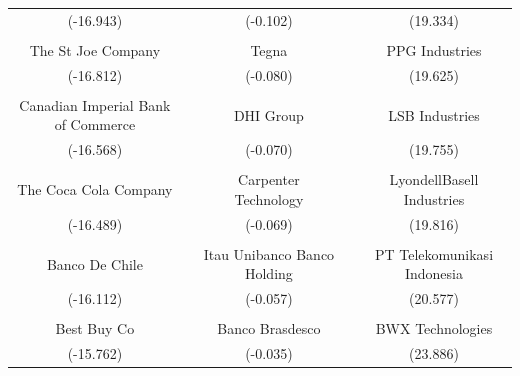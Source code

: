 \documentclass[11pt]{article}
\begin{document}
\begin{center}
\begin{table}[h]
{\begin{tabular}{clccc}
(-16.943)                          &  & (-0.102)                    &                      & (19.334)                       \\
\multicolumn{1}{l}{}               &  &                             &                      &                                \\
The St Joe Company                 &  & Tegna                       &                      & PPG Industries                 \\
(-16.812)                          &  & (-0.080)                    &                      & (19.625)                       \\
\multicolumn{1}{l}{}               &  &                             &                      &                                \\
Canadian Imperial Bank of Commerce &  & DHI Group                   &                      & LSB Industries                 \\
(-16.568)                          &  & (-0.070)                    &                      & (19.755)                       \\
\multicolumn{1}{l}{}               &  &                             &                      &                                \\
The Coca Cola Company              &  & Carpenter Technology        &                      & LyondellBasell Industries       \\
(-16.489)                          &  & (-0.069)                    &                      & (19.816)                       \\
\multicolumn{1}{l}{}               &  & \multicolumn{1}{l}{}        & \multicolumn{1}{l}{} & \multicolumn{1}{l}{}           \\
Banco De Chile                     &  & Itau Unibanco Banco Holding &                      & PT Telekomunikasi Indonesia    \\
(-16.112)                          &  & (-0.057)                    &                      & (20.577)                       \\
\multicolumn{1}{l}{}               &  &                             &                      &                                \\
Best Buy Co                        &  & Banco Brasdesco             &                      & BWX Technologies               \\
(-15.762)                          &  & (-0.035)                    &                      & (23.886)                       \\

\end{tabular}}
\end{table}
\end{center}
\end{document}
